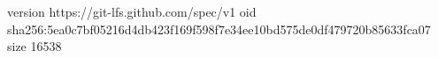 version https://git-lfs.github.com/spec/v1
oid sha256:5ea0c7bf05216d4db423f169f598f7e34ee10bd575de0df479720b85633fca07
size 16538
